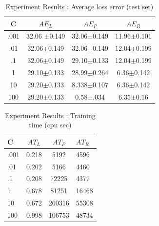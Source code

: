 \documentclass[letterpaper]{article}
\begin{document}
\begin{table}[htdp]
\begin{center}
\begin{tabular}{| c | c | c | c |}
\hline
C & $AE_{L}$ & $AE_{P}$ & $AE_{R}$ \\
\hline
.001 & 32.06 $\pm$0.149  & 32.06$\pm$0.149 & 11.96$\pm$0.101 \\
.01 & 32.06$\pm$0.149 & 32.06$\pm$0.149 & 12.04$\pm$0.199 \\
.1 & 32.06$\pm$0.149 & 29.10$\pm$0.133  & 12.04$\pm$0.199  \\
1 &29.10$\pm$0.133  & 28.99$\pm$0.264  & 6.36$\pm$0.142  \\
10 & 29.20$\pm$0.133 & 8.338$\pm$0.107 & 6.36$\pm$0.142 \\
100 & 29.20$\pm$0.133 & 0.58$\pm.034$ & 6.35$\pm0.16$  \\
\hline
\end{tabular}
\end{center}
\caption{Experiment Results : Average loss error (test set)}
\label{table: error}
\end{table}


\begin{table}[htdp]
\begin{center}
\begin{tabular}{| l | c | c | l |}
\hline
C & $ AT_{L} $ & $AT_{P}$ & $AT_{R}$ \\
\hline
.001 & 0.218 & 5192 & 4596 \\
.01 & 0.202 & 5166 & 4460 \\
.1 & 0.208 & 72225 & 4377 \\
1 & 0.678 & 81251 & 16468 \\
10 & 0.672 & 260316 & 55308 \\
100 & 0.998 & 106753  & 48734  \\
\hline
\end{tabular}
\end{center}
\caption{Experiment Results : Training time (cpu sec)}
\label{table: runtime}
\end{table}


\end{document}
